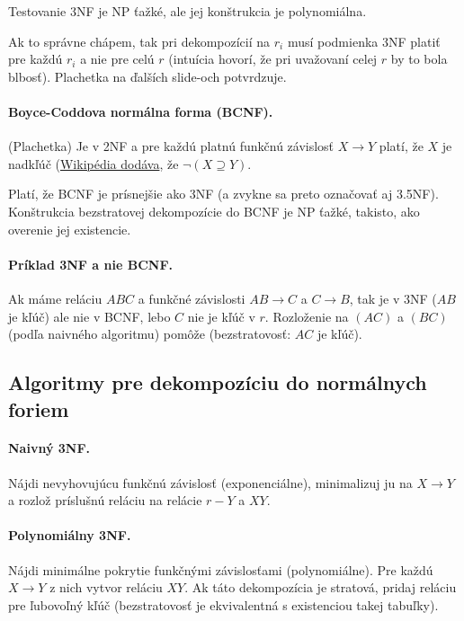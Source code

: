 \documentclass[10pt,a4paper]{article}
\begin{document}
Testovanie 3NF je NP ťažké, ale jej konštrukcia je polynomiálna. 

Ak to správne chápem, tak pri dekompozícií na $r_i$ musí podmienka 3NF platiť pre každú $r_i$ a nie pre celú $r$ (intuícia hovorí, že pri uvažovaní celej $r$ by to bola blbosť). 
Plachetka na ďalších slide-och potvrdzuje. 

\paragraph{Boyce-Coddova normálna forma (BCNF).} (Plachetka) Je v 2NF a pre každú platnú funkčnú závislosť $X \rightarrow Y$ platí, že $X$ je nadkľúč (\href{http://en.wikipedia.org/wiki/Boyce\%E2\%80\%93Codd_normal_form}{Wikipédia dodáva}, že $\neg (X \supseteq Y)$. 

Platí, že BCNF je prísnejšie ako 3NF (a zvykne sa preto označovať aj 3.5NF). 
Konštrukcia bezstratovej dekompozície do BCNF je NP ťažké, takisto, ako overenie jej existencie. 

\paragraph{Príklad 3NF a nie BCNF.}
Ak máme reláciu $ABC$ a funkčné závislosti $AB \rightarrow C$ a $C \rightarrow B$,
tak je v 3NF ($AB$ je kľúč) ale nie v BCNF, lebo $C$ nie je kľúč v $r$. Rozloženie na $(AC)$ a $(BC)$ (podľa naivného algoritmu) pomôže (bezstratovosť: $AC$ je kľúč). 

\subsection{Algoritmy pre dekompozíciu do normálnych foriem}

\paragraph{Naivný 3NF.} Nájdi nevyhovujúcu funkčnú závislosť (exponenciálne), minimalizuj ju na $X \rightarrow Y$ a rozlož príslušnú reláciu na relácie $r-Y$ a $XY$. 

\paragraph{Polynomiálny 3NF.} Nájdi minimálne pokrytie funkčnými závislosťami (polynomiálne). Pre každú $X \rightarrow Y$ z nich vytvor reláciu $XY$. Ak táto dekompozícia je stratová, pridaj reláciu pre ľubovoľný kľúč (bezstratovosť je ekvivalentná s existenciou takej tabuľky).
\end{document}
